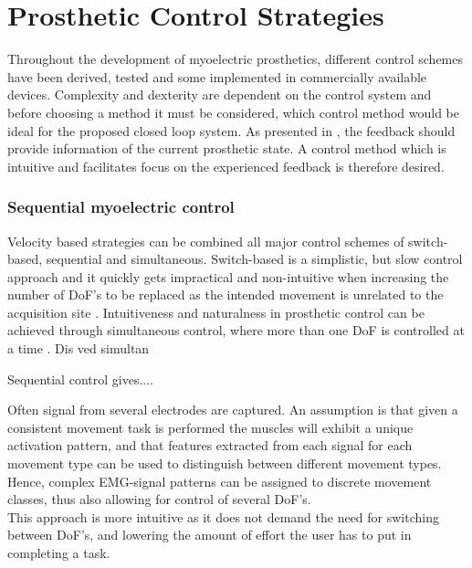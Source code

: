 \section{Prosthetic Control Strategies}

Throughout the development of myoelectric prosthetics, different control schemes have been derived, tested and some implemented in commercially available devices. Complexity and dexterity are dependent on the control system and before choosing a method it must be considered, which control method would be ideal for the proposed closed loop system. As presented in , the feedback should provide information of the current prosthetic state. A control method which is intuitive and facilitates focus on the experienced feedback is therefore desired. 

\subsubsection{Sequential myoelectric control}


Velocity based strategies can be combined all major control schemes of switch-based, sequential and simultaneous. Switch-based is a simplistic, but slow control approach and it quickly gets impractical and non-intuitive when increasing the number of DoF's to be replaced as the intended movement is unrelated to the acquisition site \cite{Wurth2014}. Intuitiveness and naturalness in prosthetic control can be achieved through simultaneous control, where more than one DoF is controlled at a time \cite{Farina2014}. Dis ved simultan

Sequential control gives....

 Often signal from several electrodes are captured. An assumption is that given a consistent movement task is performed the muscles will exhibit a unique activation pattern, and that features extracted from each signal for each movement type can be used to distinguish between different movement types. Hence, complex EMG-signal patterns can be assigned to discrete movement classes, thus also allowing for control of several DoF's.  \cite{Farina2014,Wurth2014}  \\
This approach is more intuitive as it does not demand the need for switching between DoF's, and lowering the amount of effort the user has to put in completing a task. 
